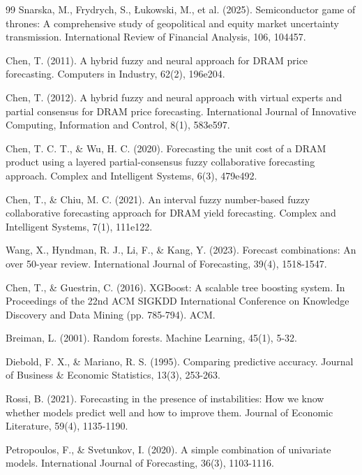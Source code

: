 \documentclass[a4paper,12pt,fontset=fandol]{ctexart}
\begin{document}
\begin{thebibliography}{99}
Snarska, M., Frydrych, S., {\L}ukowski, M., et al. (2025). Semiconductor game of thrones: A comprehensive study of geopolitical and equity market uncertainty transmission. International Review of Financial Analysis, 106, 104457.

Chen, T. (2011). A hybrid fuzzy and neural approach for DRAM price forecasting. Computers in Industry, 62(2), 196e204.

Chen, T. (2012). A hybrid fuzzy and neural approach with virtual experts and partial consensus for DRAM price forecasting. International Journal of Innovative Computing, Information and Control, 8(1), 583e597.

Chen, T. C. T., \& Wu, H. C. (2020). Forecasting the unit cost of a DRAM product using a layered partial-consensus fuzzy collaborative forecasting approach. Complex and Intelligent Systems, 6(3), 479e492.

Chen, T., \& Chiu, M. C. (2021). An interval fuzzy number-based fuzzy collaborative forecasting approach for DRAM yield forecasting. Complex and Intelligent Systems, 7(1), 111e122.

Wang, X., Hyndman, R. J., Li, F., \& Kang, Y. (2023). Forecast combinations: An over 50-year review. International Journal of Forecasting, 39(4), 1518-1547.

Chen, T., \& Guestrin, C. (2016). XGBoost: A scalable tree boosting system. In Proceedings of the 22nd ACM SIGKDD International Conference on Knowledge Discovery and Data Mining (pp. 785-794). ACM.

Breiman, L. (2001). Random forests. Machine Learning, 45(1), 5-32.

Diebold, F. X., \& Mariano, R. S. (1995). Comparing predictive accuracy. Journal of Business \& Economic Statistics, 13(3), 253-263.

Rossi, B. (2021). Forecasting in the presence of instabilities: How we know whether models predict well and how to improve them. Journal of Economic Literature, 59(4), 1135-1190.

Petropoulos, F., \& Svetunkov, I. (2020). A simple combination of univariate models. International Journal of Forecasting, 36(3), 1103-1116.

\end{thebibliography}
\endgroup
\end{document}
